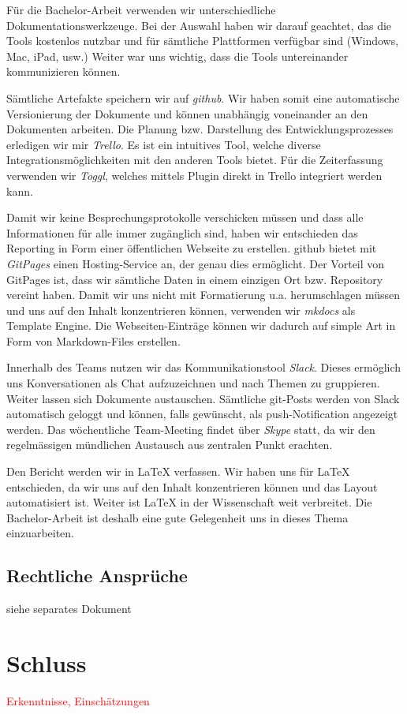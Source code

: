 \documentclass[a4paper,ngerman, 11pt, pagesize]{report}
\newcommand\Diskussionspunkt[1]{\textcolor{red}{#1}}
\begin{document}
Für die Bachelor-Arbeit verwenden wir unterschiedliche Dokumentationswerkzeuge. Bei der Auswahl haben wir darauf geachtet, das die Tools kostenlos nutzbar und für sämtliche Plattformen verfügbar sind (Windows, Mac, iPad, usw.) Weiter war uns wichtig, dass die Tools untereinander kommunizieren können. 

Sämtliche Artefakte speichern wir auf \textit{github}. Wir haben somit eine automatische Versionierung der Dokumente und können unabhängig voneinander an den Dokumenten arbeiten. Die Planung bzw. Darstellung des Entwicklungsprozesses erledigen wir mir \textit{Trello}. Es ist ein intuitives Tool, welche diverse Integrationsmöglichkeiten mit den anderen Tools bietet. Für die Zeiterfassung verwenden wir \textit{Toggl}, welches mittels Plugin direkt in Trello integriert werden kann.

Damit wir keine Besprechungsprotokolle verschicken müssen und dass alle Informationen für alle immer zugänglich sind, haben wir entschieden das Reporting in Form einer öffentlichen Webseite zu erstellen. github bietet mit \textit{GitPages} einen Hosting-Service an, der genau dies ermöglicht. Der Vorteil von GitPages ist, dass wir sämtliche Daten in einem einzigen Ort bzw. Repository vereint haben. Damit wir uns nicht mit Formatierung u.a. herumschlagen müssen und uns auf den Inhalt konzentrieren können, verwenden wir \textit{mkdocs} als Template Engine. Die Webseiten-Einträge können wir dadurch auf simple Art in Form von Markdown-Files erstellen.

Innerhalb des Teams nutzen wir das Kommunikationstool \textit{Slack}. Dieses ermöglich uns Konversationen als Chat aufzuzeichnen und nach Themen zu gruppieren. Weiter lassen sich Dokumente austauschen. Sämtliche git-Posts werden von Slack automatisch geloggt und können, falls gewünscht, als push-Notification angezeigt werden.
Das wöchentliche Team-Meeting findet über \textit{Skype} statt, da wir den regelmässigen mündlichen Austausch aus zentralen Punkt erachten.

Den Bericht werden wir in LaTeX verfassen. Wir haben uns für LaTeX entschieden, da wir uns auf den Inhalt konzentrieren können und das Layout automatisiert ist. Weiter ist LaTeX in der Wissenschaft weit verbreitet. Die Bachelor-Arbeit ist deshalb eine gute Gelegenheit uns in dieses Thema einzuarbeiten.


\section{Rechtliche Ansprüche}
siehe separates Dokument


\chapter{Schluss}
\Diskussionspunkt{Erkenntnisse, Einschätzungen}




{}	

\end{document}
